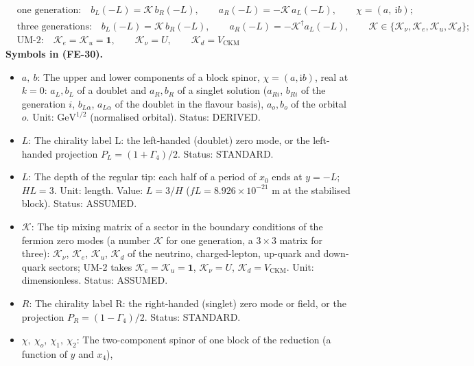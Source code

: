 \documentclass[
  10pt,
]{article}
\providecommand{\tightlist}{%
  \setlength{\itemsep}{0pt}\setlength{\parskip}{0pt}}
\begin{document}
\[
\begin{aligned}
&\text{one generation:}\quad b_L(-L) = \mathcal{K}\,b_R(-L),\qquad a_R(-L) =
 -\mathcal{K}\,a_L(-L),\qquad \chi = (a,\ \mathrm{i}b);\\
&\text{three generations:}\quad b_L(-L) = \mathcal{K}\,b_R(-L),\qquad a_R(-L) = -\mathcal{K}^\dagger
 a_L(-L),\qquad
 \mathcal{K} \in \{\mathcal{K}_\nu, \mathcal{K}_e, \mathcal{K}_u, \mathcal{K}_d\};\\
&\text{UM-2:}\quad \mathcal{K}_e = \mathcal{K}_u = \mathbf{1},\qquad \mathcal{K}_\nu = U,\qquad
 \mathcal{K}_d = V_{\mathrm{CKM}}
\end{aligned} \tag{FE-30}
\] \textbf{Symbols in (FE-30).}

\begin{itemize}
\tightlist
\item
  \(a,\ b\): The upper and lower components of a block spinor,
  \(\chi = (a, \mathrm{i}b)\), real at \(k = 0\): \(a_L, b_L\) of a
  doublet and \(a_R, b_R\) of a singlet solution (\(a_{Ri}\), \(b_{Ri}\)
  of the generation \(i\), \(b_{L\alpha}\), \(a_{L\alpha}\) of the
  doublet in the flavour basis), \(a_o, b_o\) of the orbital \(o\).
  Unit: \(\mathrm{GeV}^{1/2}\) (normalised orbital). Status: DERIVED.
\item
  \(L\): The chirality label L: the left-handed (doublet) zero mode, or
  the left-handed projection \(P_L = (1 + \Gamma_4)/2\). Status:
  STANDARD.
\item
  \(L\): The depth of the regular tip: each half of a period of \(x_0\)
  ends at \(y = -L\); \(HL = 3\). Unit: length. Value: \(L = 3/H\)
  (\(fL = 8.926\times10^{-21}\) m at the stabilised block). Status:
  ASSUMED.
\item
  \(\mathcal{K}\): The tip mixing matrix of a sector in the boundary
  conditions of the fermion zero modes (a number \(\mathcal{K}\) for one
  generation, a \(3 \times 3\) matrix for three): \(\mathcal{K}_\nu\),
  \(\mathcal{K}_e\), \(\mathcal{K}_u\), \(\mathcal{K}_d\) of the
  neutrino, charged-lepton, up-quark and down-quark sectors; UM-2 takes
  \(\mathcal{K}_e = \mathcal{K}_u = \mathbf{1}\),
  \(\mathcal{K}_\nu = U\), \(\mathcal{K}_d = V_{\mathrm{CKM}}\). Unit:
  dimensionless. Status: ASSUMED.
\item
  \(R\): The chirality label R: the right-handed (singlet) zero mode or
  field, or the projection \(P_R = (1 - \Gamma_4)/2\). Status: STANDARD.
\item
  \(\chi,\ \chi_o,\ \chi_1,\ \chi_2\): The two-component spinor of one
  block of the reduction (a function of \(y\) and \(x_4\)),

\end{itemize}
\end{document}
